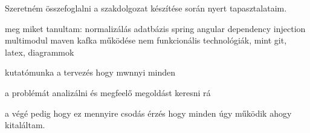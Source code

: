 Szeretném összefoglalni a szakdolgozat készítése során nyert tapasztalataim.



meg miket tanultam:
normalizálás adatbázis
spring  angular
dependency injection
multimodul maven
kafka működése
nem funkcionális technológiák, mint git, latex,  diagrammok 

kutatómunka a tervezés hogy mwnnyi minden

a problémát analizálni és megfeelő megoldást keresni rá

a végé pedig hogy ez mennyire csodás érzés hogy minden úgy működik ahogy kitaláltam.

